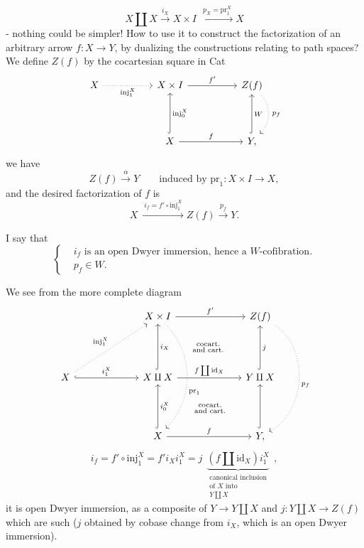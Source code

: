 \documentclass[11pt]{article}
\newcommand{\printedpage}[1]{\marginpar{\footnotesize p.~#1}}
\newcommand{\msp}[1]{\marginpar{\footnotesize [#1]}}
\begin{document}
\[
X \amalg X \xrightarrow{i_X} X \times I \ \xrightarrow{\ p_X = \mathrm{pr}_1^X\ } X
\]
- nothing could be simpler! How to use it to construct the factorization of an arbitrary arrow $f : X \longrightarrow Y$, by dualizing the constructions relating to path spaces? We define $Z(f)$ by the cocartesian square in Cat
\[
\begin{tikzcd}[column sep=5em, row sep=4em]
X \arrow[r, dotted, "\mathrm{inj}_1^X"'] & X \times I \arrow[r, "f'"] & Z(f) \arrow[d, dotted, bend left=45, "\,p_f"] \\
& X \arrow[u, hook, "\mathrm{inj}_0^X"'] \arrow[r, "f"] & Y, \arrow[u, hook, "W"']
\end{tikzcd}
\]
we have
\[
Z(f) \xrightarrow{\alpha} Y \qquad \text{induced by } \mathrm{pr}_1 : X \times I \longrightarrow X,
\]
and the desired factorization of $f$ is
\[
X \ \xrightarrow{\ i_f = f' \circ \mathrm{inj}_1^X\ } Z(f) \xrightarrow{p_f} Y.
\]

I say that
\[
\left\{
\begin{aligned}
& i_f \text{ is an open Dwyer immersion, hence a } W\text{-cofibration.} \\
& p_f \in W.
\end{aligned}
\right.
\]

\msp{page 230}
We see from the more complete diagram
\[
\begin{tikzcd}[column sep=6.5em, row sep=4.5em]
& X \times I \arrow[r, "f'"] \arrow[dd, dotted, bend left=45, "\mathrm{pr}_1"{pos=.60}] \arrow[dr, phantom, "\substack{\text{cocart.}\\ \text{and cart.}}"] & Z(f) \arrow[dd, dotted, bend left=60, "p_f"] \\
X \arrow[ur, dotted, "\mathrm{inj}_1^X"] \arrow[r, hook, "i_1^X"] & X \amalg X \arrow[u, hook, "i_X"'] \arrow[r, "f \coprod \mathrm{id}_X"] \arrow[dr, phantom, "\substack{\text{cocart.}\\ \text{and cart.}}"] & Y \amalg X \arrow[u, hook, "j"'] \\
& X \arrow[u, hook, "i_0^X"'] \arrow[r, "f"] & Y, \arrow[u, hook]
\end{tikzcd}
\]
\printedpage{147}
\[
i_f = f' \circ \mathrm{inj}_1^X = f' i_X i_1^X = j \ \ \underbrace{(f \amalg \mathrm{id}_X) i_1^X}_{\substack{\text{canonical inclusion}\\ \text{of } X \text{ into}\\ Y \coprod X}} \ \ ,
\]
it is open Dwyer immersion, as a composite of $Y \longrightarrow Y \amalg X$ and $j : Y \amalg X \longrightarrow Z(f)$ which are such ($j$ obtained by cobase change from $i_X$, which is an open Dwyer immersion).
\end{document}
